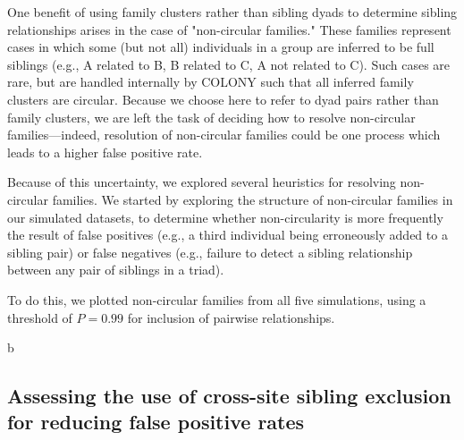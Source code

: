 \documentclass[12pt]{article}
\begin{document}
One benefit of using family clusters rather than sibling dyads to determine sibling relationships arises in the case of "non-circular families." These families represent cases in which some (but not all) individuals in a group are inferred to be full siblings (e.g., A related to B, B related to C, A not related to C). Such cases are rare, but are handled internally by COLONY such that all inferred family clusters are circular. Because we choose here to refer to dyad pairs rather than family clusters, we are left the task of deciding how to resolve non-circular families---indeed, resolution of non-circular families could be one process which leads to a higher false positive rate.

Because of this uncertainty, we explored several heuristics for resolving non-circular families. We started by exploring the structure of non-circular families in our simulated datasets, to determine whether non-circularity is more frequently the result of false positives (e.g., a third individual being erroneously added to a sibling pair) or false negatives (e.g., failure to detect a sibling relationship between any pair of siblings in a triad).

To do this, we plotted non-circular families from all five simulations, using a threshold of $P = 0.99$ for inclusion of pairwise relationships.

b

\subsection{Assessing the use of cross-site sibling exclusion for reducing false positive rates}
\end{document}
